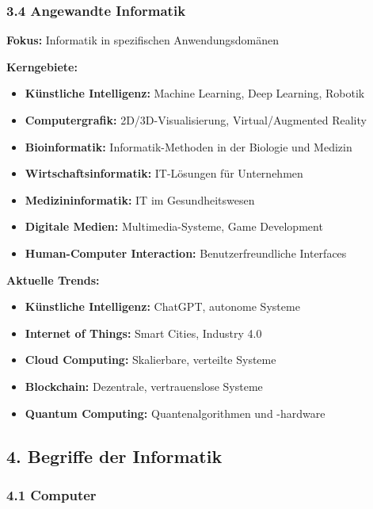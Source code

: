 \documentclass[
  11pt,
  a4paper,
  DIV=11,
  numbers=noendperiod]{scrartcl}
\providecommand{\tightlist}{%
  \setlength{\itemsep}{0pt}\setlength{\parskip}{0pt}}\usepackage{longtable,booktabs,array}
\begin{document}
\subsubsection{3.4 Angewandte Informatik}\label{angewandte-informatik}

\textbf{Fokus:} Informatik in spezifischen Anwendungsdomänen

\textbf{Kerngebiete:}

\begin{itemize}
\tightlist
\item
  \textbf{Künstliche Intelligenz:} Machine Learning, Deep Learning,
  Robotik
\item
  \textbf{Computergrafik:} 2D/3D-Visualisierung, Virtual/Augmented
  Reality
\item
  \textbf{Bioinformatik:} Informatik-Methoden in der Biologie und
  Medizin
\item
  \textbf{Wirtschaftsinformatik:} IT-Lösungen für Unternehmen
\item
  \textbf{Medizininformatik:} IT im Gesundheitswesen
\item
  \textbf{Digitale Medien:} Multimedia-Systeme, Game Development
\item
  \textbf{Human-Computer Interaction:} Benutzerfreundliche Interfaces
\end{itemize}

\textbf{Aktuelle Trends:}

\begin{itemize}
\tightlist
\item
  \textbf{Künstliche Intelligenz:} ChatGPT, autonome Systeme
\item
  \textbf{Internet of Things:} Smart Cities, Industry 4.0
\item
  \textbf{Cloud Computing:} Skalierbare, verteilte Systeme
\item
  \textbf{Blockchain:} Dezentrale, vertrauenslose Systeme
\item
  \textbf{Quantum Computing:} Quantenalgorithmen und -hardware
\end{itemize}

\subsection{4. Begriffe der Informatik}\label{begriffe-der-informatik}

\subsubsection{4.1 Computer}\label{computer}
\end{document}

